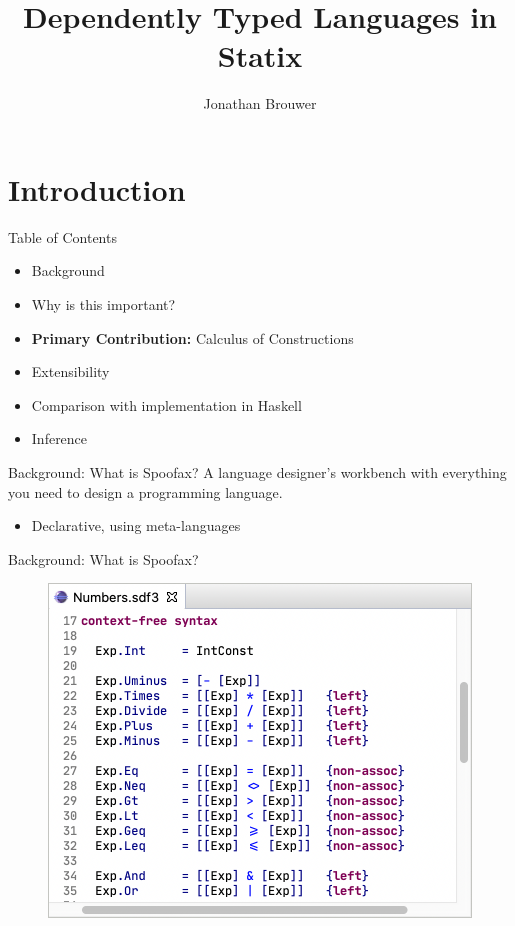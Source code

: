 \documentclass[aspectratio=43]{beamer}
\title[]{Dependently Typed Languages in Statix}
\institute[]{Delft University of Technology, The Netherlands}
\author{Jonathan Brouwer}
\begin{document}
\section{Introduction}
{
\frame{\titlepage}
}

\begin{frame}[fragile]{Table of Contents}
	\begin{itemize}
		\item Background
		\item Why is this important?
		\item \textbf{Primary Contribution:} Calculus of Constructions
		\item Extensibility
		\item Comparison with implementation in Haskell
		\item Inference
	\end{itemize}
\end{frame}

\begin{frame}[fragile]{Background: What is Spoofax?}
	A language designer's workbench with everything you need to design a programming language.
	\begin{itemize}
		\item Declarative, using meta-languages
	\end{itemize}
\end{frame}

\begin{frame}[fragile]{Background: What is Spoofax?}
\begin{figure}
	\includegraphics[width=0.8\linewidth]{img/syntax}
\end{figure}
\end{frame}
\end{document}
